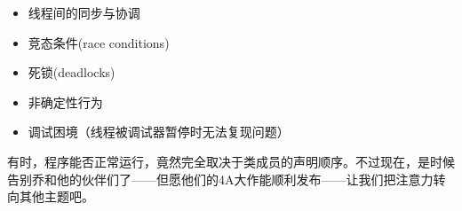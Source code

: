 \begin{itemize}
\item 
线程间的同步与协调

\item 
竞态条件(race conditions)

\item 
死锁(deadlocks)

\item 
非确定性行为

\item 
调试困境（线程被调试器暂停时无法复现问题）
\end{itemize}

有时，程序能否正常运行，竟然完全取决于类成员的声明顺序。不过现在，是时候告别乔和他的伙伴们了——但愿他们的4A大作能顺利发布——让我们把注意力转向其他主题吧。






















